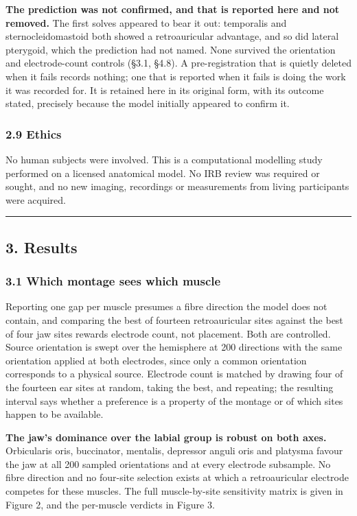 \documentclass[
  11pt,
  a4paper,
]{article}
\begin{document}
\textbf{The prediction was not confirmed, and that is reported here and not removed.}
The first solves appeared to bear it out: temporalis and sternocleidomastoid
both showed a retroauricular advantage, and so did lateral pterygoid, which the
prediction had not named. None survived the orientation and electrode-count
controls (§3.1, §4.8). A pre-registration that is quietly deleted when it fails
records nothing; one that is reported when it fails is doing the work it was
recorded for. It is retained here in its original form, with its outcome stated,
precisely because the model initially appeared to confirm it.

\subsubsection{2.9 Ethics}\label{ethics}

No human subjects were involved. This is a computational modelling study
performed on a licensed anatomical model. No IRB review was required or sought,
and no new imaging, recordings or measurements from living participants were
acquired.

\begin{center}\rule{0.5\linewidth}{0.5pt}\end{center}

\subsection{3. Results}\label{results}

\subsubsection{3.1 Which montage sees which muscle}\label{which-montage-sees-which-muscle}

Reporting one gap per muscle presumes a fibre direction the model does not
contain, and comparing the best of fourteen retroauricular sites against the
best of four jaw sites rewards electrode count, not placement. Both are
controlled. Source orientation is swept over the hemisphere at 200 directions
with the same orientation applied at both electrodes, since only a common
orientation corresponds to a physical source. Electrode count is matched by
drawing four of the fourteen ear sites at random, taking the best, and
repeating; the resulting interval says whether a preference is a property of
the montage or of which sites happen to be available.

\textbf{The jaw's dominance over the labial group is robust on both axes.}
Orbicularis oris, buccinator, mentalis, depressor anguli oris and platysma
favour the jaw at all 200 sampled orientations and at every electrode
subsample. No fibre direction and no four-site selection exists at which a
retroauricular electrode competes for these muscles. The full muscle-by-site
sensitivity matrix is given in Figure 2, and the per-muscle verdicts in
Figure 3.
\end{document}
